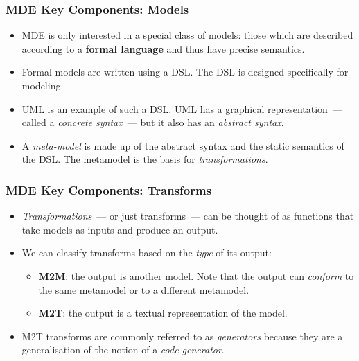 \documentclass{beamer}
\begin{document}
\begin{frame}
\frametitle{\ac{MDE} Key Components: Models}

\begin{itemize}

\item \ac{MDE} is only interested in a special class of models: those
  which are described according to a \textbf{formal language} and thus
  have precise semantics.

\pause

\item Formal models are written using a \acf{DSL}. The \ac{DSL} is
  designed specifically for modeling.

\pause

\item
  \acf{UML} is an example of such a \ac{DSL}. \ac{UML} has a graphical
  representation~--- called a \emph{concrete syntax}~--- but it also
  has an \emph{abstract syntax}.

\pause

\item A \emph{meta-model} is made up of the abstract syntax and the
  static semantics of the \ac{DSL}. The metamodel is the basis for
  \emph{transformations}.

\end{itemize}

\end{frame}

\begin{frame}
\frametitle{\ac{MDE} Key Components: Transforms}

\begin{itemize}
\item \emph{Transformations}~--- or just transforms~--- can be thought
  of as functions that take models as inputs and produce an output.

\pause

\item We can classify transforms based on the \emph{type} of its
  output:

\pause

\begin{itemize}

\item \textbf{\acf{M2M}}: the output is another model. Note that the
  output can \emph{conform} to the same metamodel or to a different
  metamodel.

\pause

\item \textbf{\acf{M2T}}: the output is a textual representation of
  the model.

\end{itemize}

\pause

\item \ac{M2T} transforms are commonly referred to as
  \emph{generators} because they are a generalisation of the notion of
  a \emph{code generator}.

\end{itemize}

\end{frame}
\end{document}
